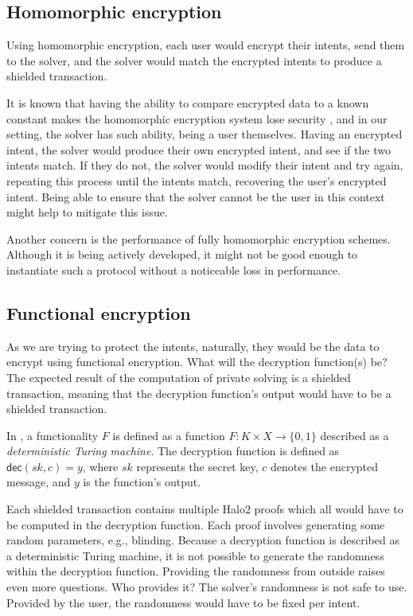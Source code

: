 \documentclass[
    9pt,            %
    report,        %
    affiltop,       %
]{art}
\begin{document}
\subsection{Homomorphic encryption}\label{HE-expanded}

Using homomorphic encryption, each user would encrypt their intents, send them to the solver, and the solver would match the encrypted intents to produce a shielded transaction.

It is known that having the ability to compare encrypted data to a known constant makes the homomorphic encryption system lose security \citep{databanks}, and in our setting, the solver has such ability, being a user themselves. Having an encrypted intent, the solver would produce their own encrypted intent, and see if the two intents match. If they do not, the solver would modify their intent and try again, repeating this process until the intents match, recovering the user's encrypted intent. Being able to ensure that the solver cannot be the user in this context might help to mitigate this issue.

Another concern is the performance of fully homomorphic encryption schemes. Although it is being actively developed, it might not be good enough to instantiate such a protocol without a noticeable loss in performance.

\subsection{Functional encryption}\label{FE-expanded}

As we are trying to protect the intents, naturally, they would be the data to encrypt using functional encryption. What will the decryption function(s) be? The expected result of the computation of private solving is a shielded transaction, meaning that the decryption function's output would have to be a shielded transaction.

In \citep{fe}, a functionality $F$ is defined as a function $F: K \times X
\rightarrow \{0, 1\}$ described as a \textit{deterministic Turing machine}. The
decryption function is defined as $\mathsf{dec}(sk, c) = y$, where $sk$
represents the secret key, $c$ denotes the encrypted message, and $y$ is the
function's output.

Each shielded transaction contains multiple Halo2 proofs which all would have to be computed in the decryption function. Each proof involves generating some random parameters, e.g., blinding. Because a decryption function is described as a deterministic Turing machine, it is not possible to generate the randomness within the decryption function. Providing the randomness from outside raises even more questions. Who provides it? The solver's randomness is not safe to use. Provided by the user, the randomness would have to be fixed per intent.
\end{document}
